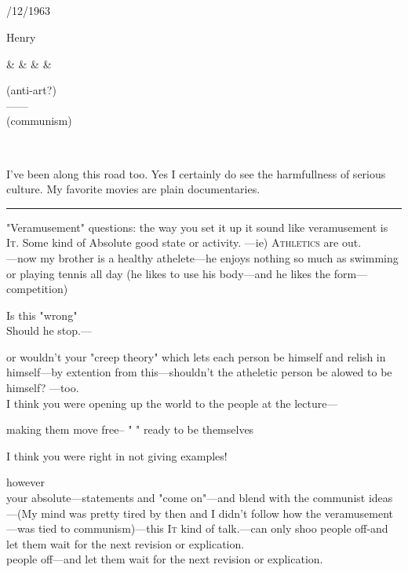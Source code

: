 \documentclass[10pt,twoside]{memoir}
\newcommand{\gap}{\plainbreak{2}}
\begin{document}
\begin{enumerate}
{\begin{enumerate}

\section{}

{ /12/1963 \par }
Henry 

\begin{tabular}
	 &  &  &  & 
		\begin{tabular}
			(anti-art?) \\
			------ \\
			(communism) \\
		\end{tabular} \\
\end{tabular}

I've been along this road too. 
Yes I certainly do see the harmfullness of serious culture. My favorite movies are plain documentaries. 

\gap


"Veramusement" 
questions: the way you set it up it sound like veramusement is \textsc{It}. Some 
kind of Absolute good state or activity. ---ie) \textsc{Athletics} are out. \\
---now my brother is a healthy athelete---he enjoys nothing so much as 
swimming or playing tennis all day (he likes to use his body---and he likes the 
form---competition) 

{ \centering
Is this "wrong" \\
Should he stop.--- \par
}

or wouldn't your "creep theory" which lets each person be himself and 
relish in himself---by extention from this---shouldn't the atheletic person be 
alowed to be himself? ---too. \\
I think you were opening up the world to the people at the lecture---


{
making them move free-- 
" " ready to be themselves \par
}


I think you were right in not giving examples! 


however \\
your absolute---statements and "come on"---and blend with the communist 
ideas---(My mind was pretty tired by then and I didn't follow how the 
veramusement---was tied to communism)---this \textsc{It} kind of talk.---can only shoo 
people off-and let them wait for the next revision or explication. \\
people off---and let them wait for the next revision or explication. 


\end{enumerate}}
\end{enumerate}
\end{document}
